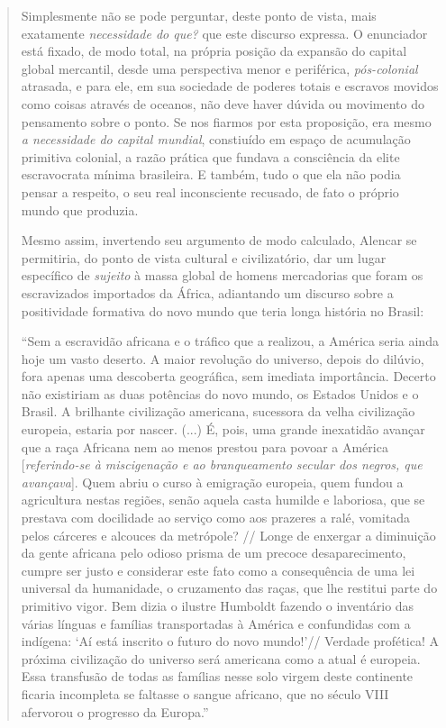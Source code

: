 \begin{quote}
Simplesmente não se pode perguntar, deste ponto de vista, mais
exatamente \emph{necessidade do que?} que este discurso expressa. O
enunciador está fixado, de modo total, na própria posição da expansão do
capital global mercantil, desde uma perspectiva menor e periférica,
\emph{pós-colonial} atrasada, e para ele, em sua sociedade de poderes
totais e escravos movidos como coisas através de oceanos, não deve haver
dúvida ou movimento do pensamento sobre o ponto. Se nos fiarmos por esta
proposição, era mesmo \emph{a necessidade do capital mundial},
constiuído em espaço de acumulação primitiva colonial, a razão prática
que fundava a consciência da elite escravocrata mínima brasileira. E
também, tudo o que ela não podia pensar a respeito, o seu real
inconsciente recusado, de fato o próprio mundo que produzia.

Mesmo assim, invertendo seu argumento de modo calculado, Alencar se
permitiria, do ponto de vista cultural e civilizatório, dar um lugar
específico de \emph{sujeito} à massa global de homens mercadorias que
foram os escravizados importados da África, adiantando um discurso sobre
a positividade formativa do novo mundo que teria longa história no
Brasil:

``Sem a escravidão africana e o tráfico que a realizou, a América seria
ainda hoje um vasto deserto. A maior revolução do universo, depois do
dilúvio, fora apenas uma descoberta geográfica, sem imediata
importância. Decerto não existiriam as duas potências do novo mundo, os
Estados Unidos e o Brasil. A brilhante civilização americana, sucessora
da velha civilização europeia, estaria por nascer. (...) É, pois, uma
grande inexatidão avançar que a raça Africana nem ao menos prestou para
povoar a América {[}\emph{referindo-se à miscigenação e ao branqueamento
secular dos negros, que avançava}{]}. Quem abriu o curso à emigração
europeia, quem fundou a agricultura nestas regiões, senão aquela casta
humilde e laboriosa, que se prestava com docilidade ao serviço como aos
prazeres a ralé, vomitada pelos cárceres e alcouces da metrópole? //
Longe de enxergar a diminuição da gente africana pelo odioso prisma de
um precoce desaparecimento, cumpre ser justo e considerar este fato como
a consequência de uma lei universal da humanidade, o cruzamento das
raças, que lhe restitui parte do primitivo vigor. Bem dizia o ilustre
Humboldt fazendo o inventário das várias línguas e famílias
transportadas à América e confundidas com a indígena: `Aí está inscrito
o futuro do novo mundo!'// Verdade profética! A próxima civilização do
universo será americana como a atual é europeia. Essa transfusão de
todas as famílias nesse solo virgem deste continente ficaria incompleta
se faltasse o sangue africano, que no século VIII afervorou o progresso
da Europa.''


\end{quote}
